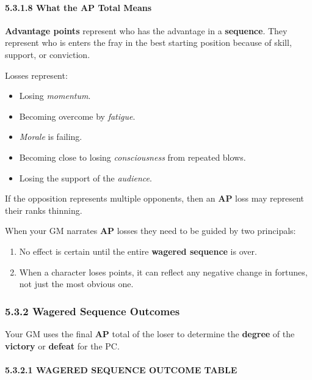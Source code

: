 \documentclass[
  11pt,
]{article}
\providecommand{\tightlist}{%
  \setlength{\itemsep}{0pt}\setlength{\parskip}{0pt}}
\begin{document}
\hypertarget{what-the-ap-total-means}{%
\paragraph{5.3.1.8 What the AP Total
Means}\label{what-the-ap-total-means}}

\textbf{Advantage points} represent who has the advantage in a
\textbf{sequence}. They represent who is enters the fray in the best
starting position because of skill, support, or conviction.

Losses represent:

\begin{itemize}
\tightlist
\item
  Losing \emph{momentum}.
\item
  Becoming overcome by \emph{fatigue}.
\item
  \emph{Morale} is failing.
\item
  Becoming close to losing \emph{consciousness} from repeated blows.
\item
  Losing the support of the \emph{audience}.
\end{itemize}

If the opposition represents multiple opponents, then an \textbf{AP}
loss may represent their ranks thinning.

When your GM narrates \textbf{AP} losses they need to be guided by two
principals:

\begin{enumerate}
\def\labelenumi{\arabic{enumi}.}
\tightlist
\item
  No effect is certain until the entire \textbf{wagered sequence} is
  over.
\item
  When a character loses points, it can reflect any negative change in
  fortunes, not just the most obvious one.
\end{enumerate}

\hypertarget{wagered-sequence-outcomes}{%
\subsubsection{5.3.2 Wagered Sequence
Outcomes}\label{wagered-sequence-outcomes}}

Your GM uses the final \textbf{AP} total of the loser to determine the
\textbf{degree} of the \textbf{victory} or \textbf{defeat} for the PC.

\hypertarget{wagered-sequence-outcome-table}{%
\paragraph{5.3.2.1 WAGERED SEQUENCE OUTCOME
TABLE}\label{wagered-sequence-outcome-table}}
\end{document}
